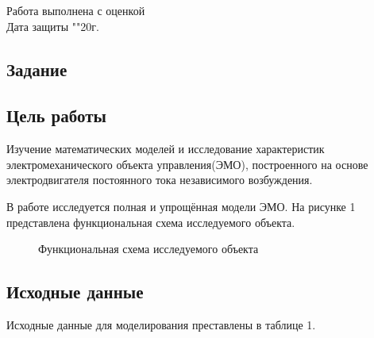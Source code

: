 \documentclass[a4paper, 11pt]{article}
\begin{document}
\begin{titlepage}
		Работа выполнена с оценкой \hspace{1cm} \underline{\hspace{8cm}} \\ 
		\vspace{1cm}
		Дата защиты "\underline{\hspace{0.7cm}}"\hspace{0.2cm}\underline{\hspace{2cm}}\hspace{0.2cm}20\underline{\hspace{0.7cm}}г.

\end{titlepage}

\begin{center}
	\section{Задание}
\end{center}
\subsection*{Цель работы} 
\par
Изучение математических моделей и исследование характеристик электромеханического объекта управления(ЭМО), построенного на основе электродвигателя постоянного тока независимого возбуждения.
\par 
В работе исследуется полная и упрощённая модели ЭМО. На рисунке 1 представлена функциональная схема исследуемого объекта.

\begin{figure}[h]
	\caption{Функциональная схема исследуемого объекта}
	\label{ris:image}
\end{figure}

\subsection*{Исходные данные}
Исходные данные для моделирования преставлены в таблице 1.
\end{document}
